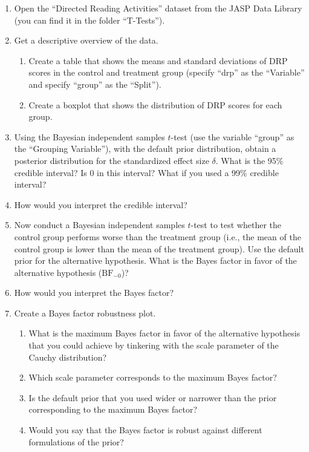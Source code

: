 \documentclass[
  letterpaper,
  DIV=11,
  numbers=noendperiod]{scrreprt}
\providecommand{\tightlist}{%
  \setlength{\itemsep}{0pt}\setlength{\parskip}{0pt}}\usepackage{longtable,booktabs,array}
\begin{document}
\begin{enumerate}
\def\labelenumi{\arabic{enumi}.}
\tightlist
\item
  Open the ``Directed Reading Activities'' dataset from the JASP Data
  Library (you can find it in the folder ``T-Tests'').
\item
  Get a descriptive overview of the data.

  \begin{enumerate}
  \def\labelenumii{\alph{enumii}.}
  \tightlist
  \item
    Create a table that shows the means and standard deviations of DRP
    scores in the control and treatment group (specify ``drp'' as the
    ``Variable'' and specify ``group'' as the ``Split'').
  \item
    Create a boxplot that shows the distribution of DRP scores for each
    group.
  \end{enumerate}
\item
  Using the Bayesian independent samples \(t\)-test (use the variable
  ``group'' as the ``Grouping Variable''), with the default prior
  distribution, obtain a posterior distribution for the standardized
  effect size \(\delta\). What is the 95\% credible interval? Is 0 in
  this interval? What if you used a 99\% credible interval?
\item
  How would you interpret the credible interval?
\item
  Now conduct a Bayesian independent samples \(t\)-test to test whether
  the control group performs worse than the treatment group (i.e., the
  mean of the control group is lower than the mean of the treatment
  group). Use the default prior for the alternative hypothesis. What is
  the Bayes factor in favor of the alternative hypothesis
  (\(\text{BF}_{-0}\))?
\item
  How would you interpret the Bayes factor?
\item
  Create a Bayes factor robustness plot.

  \begin{enumerate}
  \def\labelenumii{\alph{enumii}.}
  \tightlist
  \item
    What is the maximum Bayes factor in favor of the alternative
    hypothesis that you could achieve by tinkering with the scale
    parameter of the Cauchy distribution?
  \item
    Which scale parameter corresponds to the maximum Bayes factor?
  \item
    Is the default prior that you used wider or narrower than the prior
    corresponding to the maximum Bayes factor?
  \item
    Would you say that the Bayes factor is robust against different
    formulations of the prior?
  \end{enumerate}
\end{enumerate}
\end{document}
